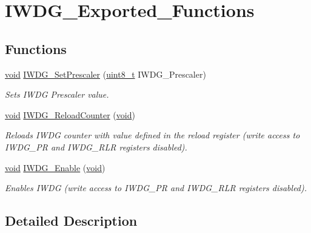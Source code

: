 \hypertarget{group___i_w_d_g___exported___functions}{}\section{I\+W\+D\+G\+\_\+\+Exported\+\_\+\+Functions}
\label{group___i_w_d_g___exported___functions}
\subsection*{Functions}
\begin{DoxyCompactItemize}
\item 
\hyperlink{usb__devapi_8h_afabf60e7f57651d6d595a02c75f07cd0}{void} \hyperlink{group___i_w_d_g___exported___functions_ga4fa7f1cd690533a35ad9e4729c0450a3}{I\+W\+D\+G\+\_\+\+Set\+Prescaler} (\hyperlink{_p_e___types_8h_aba7bc1797add20fe3efdf37ced1182c5}{uint8\+\_\+t} I\+W\+D\+G\+\_\+\+Prescaler)
\begin{DoxyCompactList}\small\item\em Sets I\+W\+DG Prescaler value. \end{DoxyCompactList}\item 
\hyperlink{usb__devapi_8h_afabf60e7f57651d6d595a02c75f07cd0}{void} \hyperlink{group___i_w_d_g___exported___functions_ga7147ebabdc3fef97f532b171a4e70d49}{I\+W\+D\+G\+\_\+\+Reload\+Counter} (\hyperlink{usb__devapi_8h_afabf60e7f57651d6d595a02c75f07cd0}{void})
\begin{DoxyCompactList}\small\item\em Reloads I\+W\+DG counter with value defined in the reload register (write access to I\+W\+D\+G\+\_\+\+PR and I\+W\+D\+G\+\_\+\+R\+LR registers disabled). \end{DoxyCompactList}\item 
\hyperlink{usb__devapi_8h_afabf60e7f57651d6d595a02c75f07cd0}{void} \hyperlink{group___i_w_d_g___exported___functions_ga479b2921c86f8c67b819f5c4bea6bdb6}{I\+W\+D\+G\+\_\+\+Enable} (\hyperlink{usb__devapi_8h_afabf60e7f57651d6d595a02c75f07cd0}{void})
\begin{DoxyCompactList}\small\item\em Enables I\+W\+DG (write access to I\+W\+D\+G\+\_\+\+PR and I\+W\+D\+G\+\_\+\+R\+LR registers disabled). \end{DoxyCompactList}\end{DoxyCompactItemize}


\subsection{Detailed Description}


